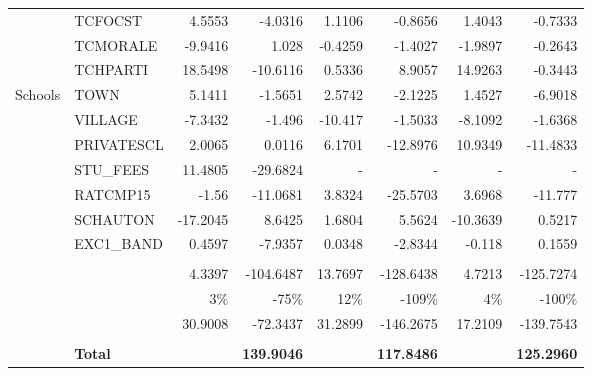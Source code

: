 \documentclass[10pt]{article}
\begin{document}
\begin{table}[htbp]
\begin{tabular}{llrrrrrr}
          & TCFOCST & 4.5553 & -4.0316 & 1.1106 & -0.8656 & 1.4043 & -0.7333 \\[0.4em]
          & TCMORALE & -9.9416 & 1.028 & -0.4259 & -1.4027 & -1.9897 & -0.2643 \\[0.4em]
          & TCHPARTI & 18.5498 & -10.6116 & 0.5336 & 8.9057 & 14.9263 & -0.3443 \\[0.4em]
    Schools & TOWN  & 5.1411 & -1.5651 & 2.5742 & -2.1225 & 1.4527 & -6.9018 \\[0.4em]
          & VILLAGE & -7.3432 & -1.496 & -10.417 & -1.5033 & -8.1092 & -1.6368 \\[0.4em]
          & PRIVATESCL & 2.0065 & 0.0116 & 6.1701 & -12.8976 & 10.9349 & -11.4833 \\[0.4em]
          & STU\_FEES & 11.4805 & -29.6824 & -     & -     & -     & - \\[0.4em]
          & RATCMP15 & -1.56 & -11.0681 & 3.8324 & -25.5703 & 3.6968 & -11.777 \\[0.4em]
          & SCHAUTON & -17.2045 & 8.6425 & 1.6804 & 5.5624 & -10.3639 & 0.5217 \\[0.4em]
          & EXC1\_BAND & 0.4597 & -7.9357 & 0.0348 & -2.8344 & -0.118 & 0.1559 \\[0.4em]
          \cline{3-8} \\
          &       & 4.3397 & -104.6487 & 13.7697 & -128.6438 & 4.7213 & -125.7274 \\[0.4em]
          &       & 3\%   & -75\% & 12\%  & -109\% & 4\%   & -100\% \\[0.4em]
          &       & 30.9008 & -72.3437 & 31.2899 & -146.2675 & 17.2109 & -139.7543 \\[0.4em]
          \cline{2-8} \\
          &      \textbf{Total} & \textbf{} & \textbf{139.9046} & \textbf{} & \textbf{117.8486} & \textbf{} & \textbf{125.2960} \\
    \bottomrule
    \end{tabular}%
  \label{tab:addlabel}%
\end{table}%
\end{document}

